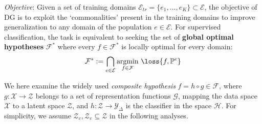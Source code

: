 \textit{Objective}: Given a set of training domains $\mathcal{E}_{tr}=\{e_1,...,e_K\} \subset \mathcal{E}$, the objective of DG is to exploit the `commonalities' present in the training domains to improve generalization to any domain of the population $e\in \mathcal{E}$. For supervised classification, the task is equivalent to seeking the set of \textbf{global optimal hypotheses} $\mathcal{F}^{*}$ 
where every $f\in \mathcal{F}^*$ is locally optimal for every domain:
    \begin{equation}
    \mathcal{F}^{*} := \bigcap_{{e}\in \mathcal{E}}\underset{f\in \mathcal{F}}{\text{argmin}} \ \loss{f,\mathbb{P}^{e}}
    \label{eq:optimal}
\end{equation}



\color{black}

We here examine the widely used {\it composite hypothesis} $f = h \circ g \in \mathcal{F}$, where $g : \mathcal{X} \rightarrow \mathcal{Z}$ belongs to a set of representation functions $\mathcal{G}$, mapping the data space $\mathcal{X}$ to a latent space $\mathcal{Z}$, and $h : \mathcal{Z} \rightarrow \mathcal{Y}_{\Delta}$ is the classifier in the space $\mathcal{H}$. For simplicity, we assume \(\mathcal{Z}_c, \mathcal{Z}_e \subseteq \mathcal{Z}\) in the following analyses.


